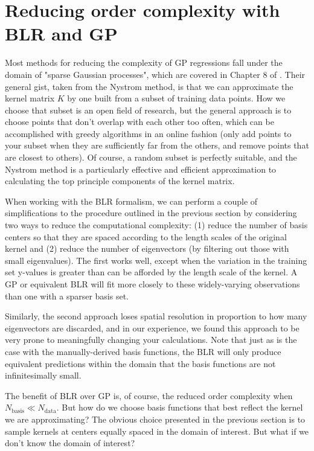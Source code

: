 \documentclass{article}
\begin{document}
\section{Reducing order complexity with BLR and GP}

Most methods for reducing the complexity of GP regressions fall under the domain of "sparse Gaussian processes", which are covered in Chapter 8 of \cite{rasmussen}. Their general gist, taken from the Nystrom method\cite{nystrom}, is that we can approximate the kernel matrix $K$ by one built from a subset of training data points. How we choose that subset is an open field of research, but the general approach is to choose points that don't overlap with each other too often, which can be accomplished with greedy algorithms in an online fashion (only add points to your subset when they are sufficiently far from the others, and remove points that are closest to others). Of course, a random subset is perfectly suitable, and the Nystrom method is a particularly effective and efficient approximation to calculating the top principle components of the kernel matrix.

When working with the BLR formalism, we can perform a couple of simplifications to the procedure outlined in the previous section by considering two ways to reduce the computational complexity: (1) reduce the number of basis centers so that they are spaced according to the length scales of the original kernel and (2) reduce the number of eigenvectors (by filtering out those with small eigenvalues). The first works well, except when the variation in the training set y-values is greater than can be afforded by the length scale of the kernel. A GP or equivalent BLR will fit more closely to these widely-varying observations than one with a sparser basis set. 

Similarly, the second approach loses spatial resolution in proportion to how many eigenvectors are discarded, and in our experience, we found this approach to be very prone to meaningfully changing your calculations. Note that just as is the case with the manually-derived basis functions, the BLR will only produce equivalent predictions within the domain that the basis functions are not infinitesimally small.

The benefit of BLR over GP is, of course, the reduced order complexity when $N_\text{basis}\ll N_\text{data}$. But how do we choose basis functions that best reflect the kernel we are approximating? The obvious choice presented in the previous section is to sample kernels at centers equally spaced in the domain of interest. But what if we don't know the domain of interest?
\end{document}
